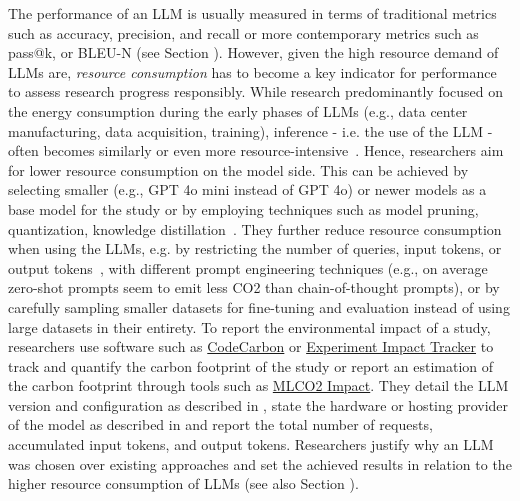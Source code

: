 
The performance of an LLM is usually measured in terms of traditional metrics such as accuracy, precision, and recall or more contemporary metrics such as pass@k, or BLEU-N (see Section \benchmarksmetrics).
However, given the high resource demand of LLMs are, \emph{resource consumption} has to become a key indicator for performance to assess research progress responsibly. 
While research predominantly focused on the energy consumption during the early phases of LLMs (e.g., data center manufacturing, data acquisition, training), inference - i.e. the use of the LLM - often becomes similarly or even more resource-intensive~\cite{de2023growing, DBLP:conf/mlsys/WuRGAAMCBHBGGOM22, DBLP:journals/corr/abs-2410-02950, JIANG2024202, mitu2024hidden}.
Hence, researchers  \should aim for lower resource consumption on the model side.
This can be achieved by selecting smaller (e.g., GPT 4o mini instead of GPT 4o) or newer models as a base model for the study or by employing techniques such as model pruning, quantization, knowledge distillation~\cite{mitu2024hidden}.
They \should further reduce resource consumption when using the LLMs, e.g. by restricting the number of queries, input tokens, or output tokens~\cite{mitu2024hidden}, with different prompt engineering techniques (e.g., on average zero-shot prompts seem to emit less CO2 than chain-of-thought prompts), or by carefully sampling smaller datasets for fine-tuning and evaluation instead of using large datasets in their entirety.
To report the environmental impact of a study, researchers \should use software such as \href{https://github.com/mlco2/codecarbon}{CodeCarbon} or \href{experiment-impact-tracker}{Experiment Impact Tracker} to track and quantify the carbon footprint of the study or report an estimation of the carbon footprint through tools such as \href{https://mlco2.github.io/impact/#about}{MLCO2 Impact}.
They \should detail the LLM version and configuration as described in \modelversion, state the hardware or hosting provider of the model as described in \toolarchitecture and report the total number of requests, accumulated input tokens, and output tokens.
Researchers \must justify why an LLM was chosen over existing approaches and set the achieved results in relation to the higher resource consumption of LLMs (see also Section \benchmarksmetrics).


